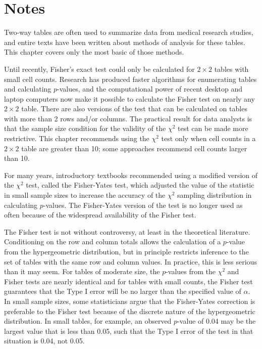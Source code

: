 \section{Notes}
\label{infForPropNotes}

Two-way tables are often used to summarize data from medical research studies, and entire texts have been written about methods of analysis for these tables.  This chapter covers only the most basic of those methods.

Until recently, Fisher's exact test could only be calculated for $2 \times 2$ tables with small cell counts. Research has produced faster algorithms for enumerating tables and calculating $p$-values, and the computational power of recent desktop and laptop computers now make it possible to calculate the Fisher test on nearly any $2 \times 2$ table.  There are also versions of the test that can be calculated on tables with more than 2 rows and/or columns.  The practical result for data analysts is that the sample size condition for the validity of the $\chi^2$ test can be made more restrictive.  This chapter recommends using the $\chi^2$ test only when cell counts in a $2 \times 2$ table are greater than 10; some approaches recommend cell counts larger than 10.

For many years, introductory textbooks recommended using a modified version of the $\chi^2$ test, called the Fisher-Yates test, which adjusted the value of the statistic in small sample sizes to increase the accuracy of the $\chi^2$ sampling distribution in calculating $p$-values.  The Fisher-Yates version of the test is no longer used as often because of the widespread availability of the Fisher test.

The Fisher test is not without controversy, at least in the theoretical literature.  Conditioning on the row and column totals allows the calculation of a $p$-value from the hypergeometric distribution, but in principle restricts inference to the set of tables with the same row and column values.  In practice, this is less serious than it may seem. For tables of moderate size, the $p$-values from the $\chi^2$ and Fisher tests are nearly identical and for tables with small counts, the Fisher test guarantees that the Type I error will be no larger than the specified value of $\alpha$.   In small sample sizes, some statisticians argue that the Fisher-Yates correction is preferable to the Fisher test because of the discrete nature of the hypergeometric distribution.  In small tables, for example, an observed $p$-value of 0.04 may be the largest value that is less than 0.05, such that the Type I error of the test in that situation is 0.04, not 0.05.

